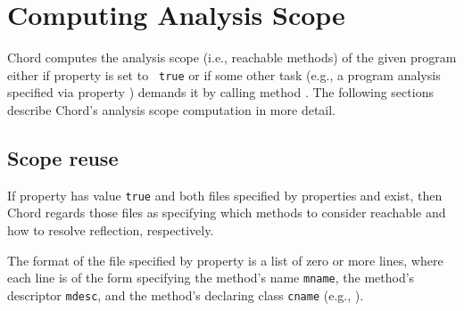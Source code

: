 \section{Computing Analysis Scope}
\label{sec:computing-scope}

Chord computes the analysis scope (i.e., reachable methods) of the given
program either if property  is set to {\tt
  true} or if some other task (e.g., a program analysis specified via
property ) demands it by calling method
.
The following sections describe Chord's analysis scope 
computation in more detail.
%
%

\subsection{Scope reuse}

If property  has value {\tt true} and both
files specified by properties  and
 exist, then Chord regards those files as
specifying which methods to consider reachable and how to resolve
reflection, respectively.

The format of the file specified by property 
is a list of zero or more lines, where each line is of the form
specifying the method's name {\tt mname}, the method's descriptor
{\tt mdesc}, and the method's declaring class {\tt cname} (e.g.,
\code{main:([Ljava/lang/String;)V@foo.bar.Main}).

